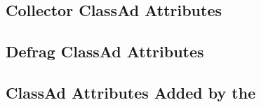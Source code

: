 \subsection*{\label{sec:Collector-ClassAd-Attributes}Collector ClassAd Attributes}


\subsection*{\label{sec:Defrag-Attributes}Defrag ClassAd Attributes}


\subsection*{\label{sec:Collector-Added-Attributes}ClassAd Attributes Added by the }

